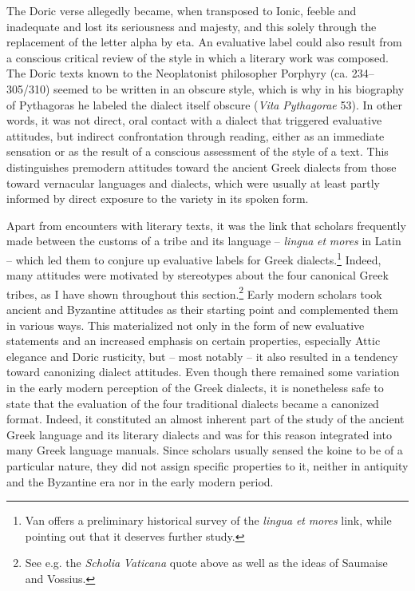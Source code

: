 The Doric verse allegedly became, when transposed to Ionic, feeble and inadequate and lost its seriousness and majesty, and this solely through the replacement of the letter alpha by eta. An evaluative label could also result from a conscious critical review of the style in which a literary work was composed. The Doric texts known to the Neoplatonist philosopher Porphyry (ca. 234–305/310) seemed to be written in an obscure style, which is why in his biography of Pythagoras he labeled the dialect itself obscure (\textit{Vita} \textit{Pythagorae} 53). In other words, it was not direct, oral contact with a dialect that triggered evaluative attitudes, but indirect confrontation through reading, either as an immediate sensation or as the result of a conscious assessment of the style of a text. This distinguishes premodern attitudes toward the ancient Greek dialects from those toward vernacular languages and dialects, which were usually at least partly informed by direct exposure to the variety in its spoken form.

Apart from encounters with literary texts, it was the link that scholars frequently made between the customs of a tribe and its language – \textit{lingua} \textit{et} \textit{mores} in Latin – which led them to conjure up evaluative labels for Greek dialects.\footnote{Van \citet{Hal2013} offers a preliminary historical survey of the \textit{lingua} \textit{et} \textit{mores} link, while pointing out that it deserves further study.} Indeed, many attitudes were motivated by stereotypes about the four canonical Greek tribes, as I have shown throughout this section.\footnote{See e.g. the \textit{Scholia} \textit{Vaticana} quote above as well as the ideas of Saumaise and Vossius.} Early modern scholars took ancient and Byzantine attitudes as their starting point and complemented them in various ways. This materialized not only in the form of new evaluative statements and an increased emphasis on certain properties, especially Attic elegance and Doric rusticity, but – most notably – it also resulted in a tendency toward canonizing dialect attitudes. Even though there remained some variation in the early modern perception of the Greek dialects, it is nonetheless safe to state that the evaluation of the four traditional dialects became a canonized format. Indeed, it constituted an almost inherent part of the study of the ancient Greek language and its literary dialects and was for this reason integrated into many Greek language manuals. Since scholars usually sensed the koine to be of a particular nature, they did not assign specific properties to it, neither in antiquity and the Byzantine era nor in the early modern period.

